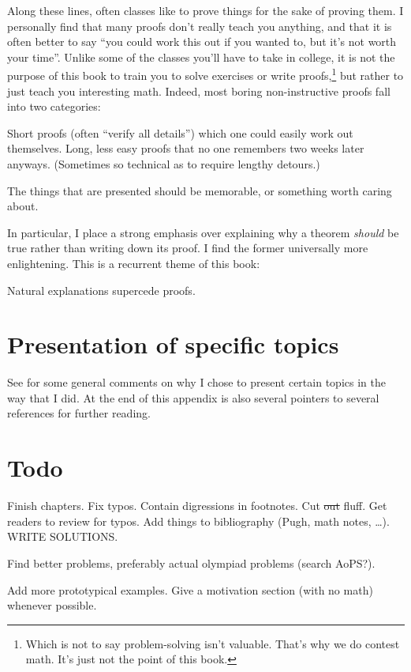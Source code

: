 Along these lines, often classes like to prove things for the sake of proving them.
I personally find that many proofs don't really teach you anything,
and that it is often better to say ``you could work this out if you wanted to, but it's not worth your time''.
Unlike some of the classes you'll have to take in college,
it is not the purpose of this book to train you to solve exercises or write proofs,\footnote{%
	Which is not to say problem-solving isn't valuable.
	That's why we do contest math.
	It's just not the point of this book.}
but rather to just teach you interesting math.
Indeed, most boring non-instructive proofs fall into two categories:
\begin{enumerate}[(i)]
	\ii Short proofs (often ``verify all details'') which one could easily work out themselves.
	\ii Long, less easy proofs that no one remembers two weeks later anyways.
	(Sometimes so technical as to require lengthy detours.)
\end{enumerate}
The things that are presented should be memorable, or something worth caring about.

In particular, I place a strong emphasis over explaining why a theorem \emph{should}
be true rather than writing down its proof.
I find the former universally more enlightening.
This is a recurrent theme of this book:
\begin{moral}
	Natural explanations supercede proofs.
\end{moral}

\section*{Presentation of specific topics}
See  for some general comments on why I chose
to present certain topics in the way that I did.
At the end of this appendix is also several pointers to
several references for further reading.

\section*{Todo}
Finish chapters.
Fix typos.
Contain digressions in footnotes.
Cut \sout{out} fluff.
Get readers to review for typos.
Add things to bibliography (Pugh, math notes, \dots).
WRITE SOLUTIONS.

Find better problems, preferably actual olympiad problems (search AoPS?).

Add more prototypical examples.
Give a motivation section (with no math) whenever possible.

